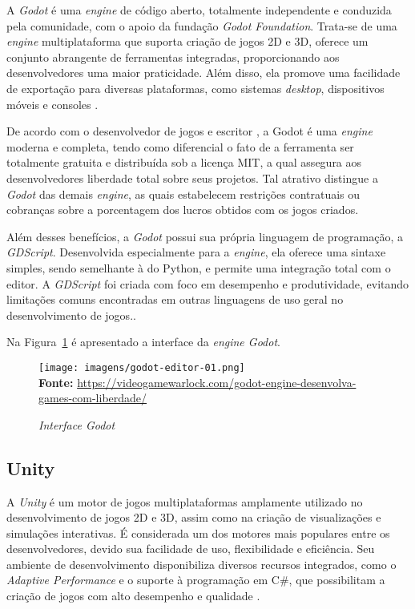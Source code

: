 A \textit{Godot} é uma \textit{engine} de código aberto, totalmente independente e conduzida pela comunidade, com o apoio da fundação \textit{Godot Foundation}. Trata-se de uma \textit{engine} multiplataforma que suporta criação de jogos 2D e 3D, oferece um conjunto abrangente de ferramentas integradas, proporcionando aos desenvolvedores uma maior praticidade. Além disso, ela promove uma facilidade de exportação para diversas plataformas, como sistemas \textit{desktop}, dispositivos móveis e consoles  \cite{GodotDocs2024}.

De acordo com o desenvolvedor de jogos e escritor , a Godot é uma \textit{engine} moderna e completa, tendo como diferencial o fato de a ferramenta ser totalmente gratuita e distribuída sob a licença MIT, a qual assegura aos desenvolvedores liberdade total sobre seus projetos. Tal atrativo distingue a \textit{Godot} das demais \textit{engine}, as quais estabelecem restrições contratuais ou cobranças sobre a porcentagem dos lucros obtidos com os jogos criados.


Além desses benefícios, a \textit{Godot} possui sua própria linguagem de programação, a  \textit{GDScript}. Desenvolvida especialmente para a \textit{engine}, ela oferece uma sintaxe simples, sendo semelhante à do Python, e permite uma integração total com o editor. A \textit{GDScript} foi criada com foco em desempenho e produtividade, evitando limitações comuns encontradas em outras linguagens de uso geral no desenvolvimento de jogos.\cite{GodotDocs2024}.

Na Figura~\ref{fig:godot} é apresentado a interface da \textit{engine Godot}.

\FloatBarrier 
\begin{figure}[!htbp]
	\centering
	\caption{\textit{Interface Godot}}
	\texttt{[image: imagens/godot-editor-01.png]}
	\\\textbf{Fonte:} \url{https://videogamewarlock.com/godot-engine-desenvolva-games-com-liberdade/} 
	\label{fig:godot}
\end{figure}
\FloatBarrier


\subsection{Unity}

A \textit{Unity} é um motor de jogos multiplataformas amplamente utilizado no desenvolvimento de jogos 2D e 3D, assim como na criação de visualizações e simulações interativas. É considerada um dos motores mais populares entre os desenvolvedores, devido sua facilidade de uso, flexibilidade e eficiência. Seu ambiente de desenvolvimento disponibiliza diversos recursos integrados, como o \textit{Adaptive Performance} e o suporte à programação em C\#, que possibilitam a criação de jogos com alto desempenho e qualidade \cite{Hussain2020}.

